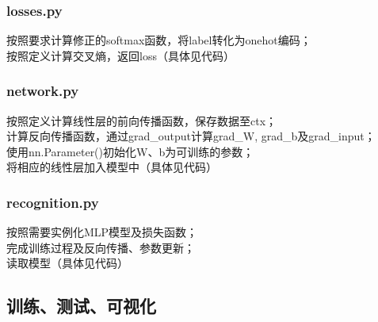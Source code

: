 \documentclass[a4paper]{article}
\begin{document}
\subsubsection{losses.py}
按照要求计算修正的softmax函数，将label转化为onehot编码；\\
按照定义计算交叉熵，返回loss（具体见代码）
\subsubsection{network.py}
按照定义计算线性层的前向传播函数，保存数据至ctx；\\
计算反向传播函数，通过grad\_output计算grad\_W, grad\_b及grad\_input；\\
使用nn.Parameter()初始化W、b为可训练的参数；\\
将相应的线性层加入模型中（具体见代码）
\subsubsection{recognition.py}
按照需要实例化MLP模型及损失函数；\\
完成训练过程及反向传播、参数更新；\\
读取模型（具体见代码）
\subsection{训练、测试、可视化}
\end{document}
